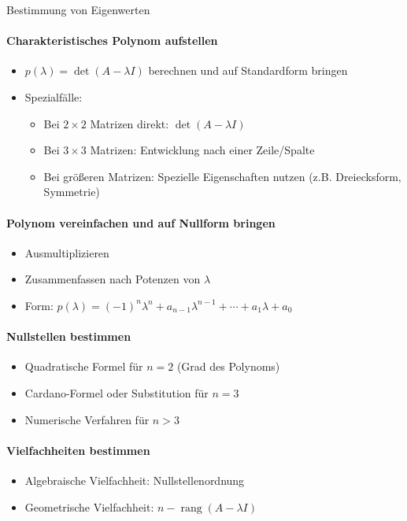 \begin{KR}{Bestimmung von Eigenwerten}

\paragraph{Charakteristisches Polynom aufstellen}
\begin{itemize}
    \item $p(\lambda) = \det(A-\lambda I)$ berechnen und auf Standardform bringen
    \item  Spezialfälle:
    \begin{itemize}
        \item Bei $2 \times 2$ Matrizen direkt: $\det(A - \lambda I)$
        \item Bei $3 \times 3$ Matrizen: Entwicklung nach einer Zeile/Spalte
        \item Bei größeren Matrizen: Spezielle Eigenschaften nutzen
              (z.B. Dreiecksform, Symmetrie)
    \end{itemize}
\end{itemize}
    
    \paragraph{Polynom vereinfachen und auf Nullform bringen}
    \begin{itemize}
        \item Ausmultiplizieren
        \item Zusammenfassen nach Potenzen von $\lambda$
        \item Form: $p(\lambda) = (-1)^n\lambda^n + a_{n-1}\lambda^{n-1} + \cdots + a_1\lambda + a_0$
    \end{itemize}

    \paragraph{Nullstellen bestimmen}
    \begin{itemize}
        \item Quadratische Formel für $n=2$ (Grad des Polynoms)
        \item Cardano-Formel oder Substitution für $n=3$
        \item Numerische Verfahren für $n>3$
    \end{itemize}

    \paragraph{Vielfachheiten bestimmen}
    \begin{itemize}
        \item Algebraische Vielfachheit: Nullstellenordnung
        \item Geometrische Vielfachheit: $n-\operatorname{rang}(A-\lambda I)$
    \end{itemize}
\end{KR}

